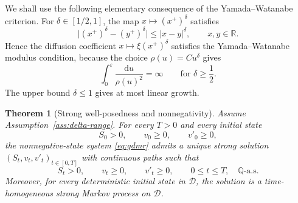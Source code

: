 \documentclass[pdflatex,sn-mathphys-num]{sn-jnl}
\theoremstyle{thmstyleone}%
\newtheorem{theorem}{Theorem}[section]
\theoremstyle{thmstylethree}%
\theoremstyle{thmstyletwo}%
\newcommand{\dd}{\mathrm d}
\newcommand{\Q}{\mathbb Q}
\newcommand{\R}{\mathbb R}
\begin{document}
We shall use the following elementary consequence of the Yamada--Watanabe
criterion. For $\delta\in[1/2,1]$, the map $x\mapsto (x^+)^\delta$ satisfies
\[
\bigl|(x^+)^\delta-(y^+)^\delta\bigr|
\le |x-y|^\delta,\qquad x,y\in\R.
\]
Hence the diffusion coefficient $x\mapsto \xi(x^+)^\delta$ satisfies the
Yamada--Watanabe modulus condition, because the choice $\rho(u)=C u^\delta$
gives
\[
\int_0^\varepsilon \frac{\dd u}{\rho(u)^2}
=\infty
\qquad\text{for }\delta\ge \frac12.
\]
The upper bound $\delta\le1$ gives at most linear growth.

\begin{theorem}[Strong well-posedness and nonnegativity]\label{thm:wellposed}
Assume Assumption~\ref{ass:delta-range}. For every $T>0$ and every initial
state
\[
S_0>0,\qquad v_0\ge0,\qquad v'_0\ge0,
\]
the nonnegative-state system \eqref{eq:gdmr} admits a unique strong solution
$(S_t,v_t,v'_t)_{t\in[0,T]}$ with continuous paths such that
\[
S_t>0,\qquad v_t\ge0,\qquad v'_t\ge0,\qquad
0\le t\le T,\quad \Q\text{-a.s.}
\]
Moreover, for every deterministic initial state in $\mathcal D$, the solution
is a time-homogeneous strong Markov process on $\mathcal D$.
\end{theorem}
\end{document}
